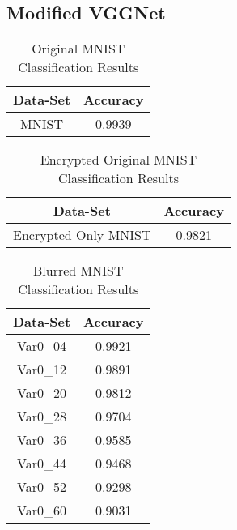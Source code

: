 \documentclass[12pt, titlepage]{article}
\begin{document}
~\newpage
\subsection{Modified VGGNet}

\begin{table}[!h]
	\begin{center}
		\begin{tabular}{| c | c |}
			\hline
			\textbf{Data-Set} & \textbf{Accuracy}\\
			\hline
			MNIST & 0.9939\\
			\hline
		\end{tabular}
		\caption{Original MNIST Classification Results}
		\label{table:modVGG_MNIST}
	\end{center}
\end{table}

\begin{table}[!h]
	\begin{center}
		\begin{tabular}{| c | c |}
			\hline
			\textbf{Data-Set} & \textbf{Accuracy}\\
			\hline
			Encrypted-Only MNIST & 0.9821\\
			\hline
		\end{tabular}
		\caption{Encrypted Original MNIST Classification Results}
		\label{table:modVGG_Encryption}
	\end{center}
\end{table}

\begin{table}[!h]
	\begin{center}
		\begin{tabular}{| c | c |}
			\hline
			\textbf{Data-Set} & \textbf{Accuracy}\\
			\hline
			Var0\_04 & 0.9921\\
			\hline
			Var0\_12 & 0.9891\\
			\hline
			Var0\_20 & 0.9812\\
			\hline
			Var0\_28 & 0.9704\\
			\hline
			Var0\_36 & 0.9585\\
			\hline
			Var0\_44 & 0.9468\\
			\hline
			Var0\_52 & 0.9298\\
			\hline
			Var0\_60 & 0.9031\\
			\hline
		\end{tabular}
		\caption{Blurred MNIST Classification Results}
		\label{table:modVGG_Blurred}
	\end{center}
\end{table}
\end{document}
